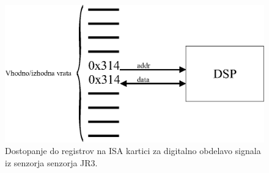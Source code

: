 \begin{figure}[]
	\centering
	\includegraphics[scale=0.5]{./Slike/dsp-registers.eps}
	\caption{Dostopanje do registrov na ISA kartici za digitalno obdelavo signala iz senzorja senzorja JR3.}
	\label{fig:dsp-registers}
\end{figure}
